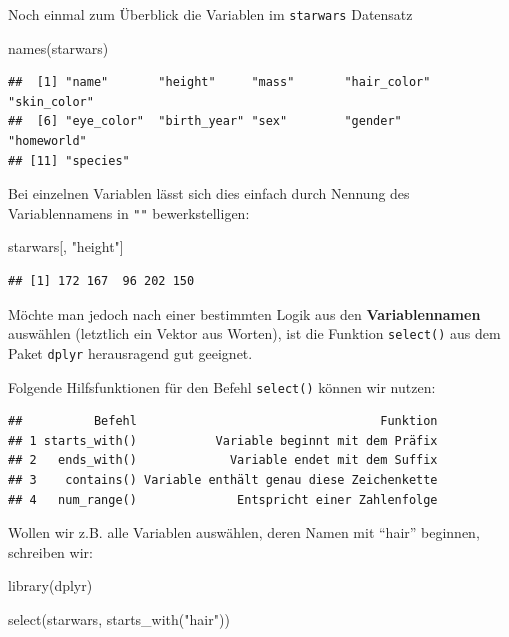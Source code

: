 \documentclass[
]{book}
\newenvironment{Shaded}{\begin{snugshade}}{\end{snugshade}}
\newcommand{\FunctionTok}[1]{\textcolor[rgb]{0.00,0.00,0.00}{#1}}
\newcommand{\NormalTok}[1]{#1}
\newcommand{\StringTok}[1]{\textcolor[rgb]{0.31,0.60,0.02}{#1}}
\begin{document}
Noch einmal zum Überblick die Variablen im \texttt{starwars} Datensatz

\begin{Shaded}
\begin{Highlighting}[]
\FunctionTok{names}\NormalTok{(starwars)}
\end{Highlighting}
\end{Shaded}

\begin{verbatim}
##  [1] "name"       "height"     "mass"       "hair_color" "skin_color"
##  [6] "eye_color"  "birth_year" "sex"        "gender"     "homeworld" 
## [11] "species"
\end{verbatim}

Bei einzelnen Variablen lässt sich dies einfach durch Nennung des Variablennamens in \texttt{""} bewerkstelligen:

\begin{Shaded}
\begin{Highlighting}[]
\NormalTok{starwars[, }\StringTok{"height"}\NormalTok{]}
\end{Highlighting}
\end{Shaded}

\begin{verbatim}
## [1] 172 167  96 202 150
\end{verbatim}

Möchte man jedoch nach einer bestimmten Logik aus den \textbf{Variablennamen} auswählen (letztlich ein Vektor aus Worten), ist die Funktion \texttt{select()} aus dem Paket \texttt{dplyr} herausragend gut geeignet.

Folgende Hilfsfunktionen für den Befehl \texttt{select()} können wir nutzen:

\begin{verbatim}
##          Befehl                                  Funktion
## 1 starts_with()           Variable beginnt mit dem Präfix
## 2   ends_with()             Variable endet mit dem Suffix
## 3    contains() Variable enthält genau diese Zeichenkette
## 4   num_range()              Entspricht einer Zahlenfolge
\end{verbatim}

Wollen wir z.B. alle Variablen auswählen, deren Namen mit ``hair'' beginnen, schreiben wir:

\begin{Shaded}
\begin{Highlighting}[]
\FunctionTok{library}\NormalTok{(dplyr)}

\FunctionTok{select}\NormalTok{(starwars, }\FunctionTok{starts\_with}\NormalTok{(}\StringTok{"hair"}\NormalTok{))}
\end{Highlighting}
\end{Shaded}
\end{document}

